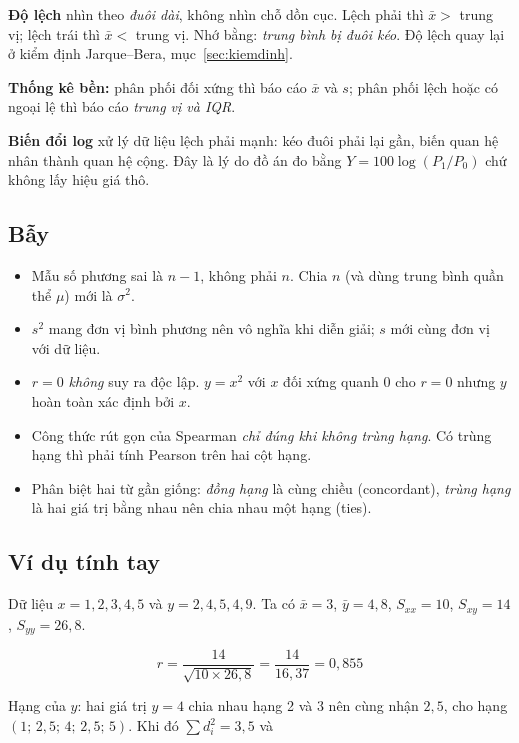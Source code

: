 \documentclass[11pt]{article}
\begin{document}
\textbf{Độ lệch} nhìn theo \emph{đuôi dài}, không nhìn chỗ dồn cục. Lệch phải thì
$\bar x >$ trung vị; lệch trái thì $\bar x <$ trung vị. Nhớ bằng: \emph{trung bình
bị đuôi kéo}. Độ lệch quay lại ở kiểm định Jarque--Bera, mục~\ref{sec:kiemdinh}.

\textbf{Thống kê bền:} phân phối đối xứng thì báo cáo $\bar x$ và $s$; phân phối
lệch hoặc có ngoại lệ thì báo cáo \emph{trung vị và IQR}.

\textbf{Biến đổi log} xử lý dữ liệu lệch phải mạnh: kéo đuôi phải lại gần, biến
quan hệ nhân thành quan hệ cộng. Đây là lý do đồ án đo bằng
$Y = 100\log(P_1/P_0)$ chứ không lấy hiệu giá thô.

\subsection*{Bẫy}

\begin{itemize}
\item Mẫu số phương sai là $n-1$, không phải $n$. Chia $n$ (và dùng trung bình
      quần thể $\mu$) mới là $\sigma^2$.
\item $s^2$ mang đơn vị bình phương nên vô nghĩa khi diễn giải; $s$ mới cùng đơn
      vị với dữ liệu.
\item $r=0$ \emph{không} suy ra độc lập. $y=x^2$ với $x$ đối xứng quanh 0 cho
      $r=0$ nhưng $y$ hoàn toàn xác định bởi $x$.
\item Công thức rút gọn của Spearman \emph{chỉ đúng khi không trùng hạng}. Có
      trùng hạng thì phải tính Pearson trên hai cột hạng.
\item Phân biệt hai từ gần giống: \emph{đồng hạng} là cùng chiều (concordant),
      \emph{trùng hạng} là hai giá trị bằng nhau nên chia nhau một hạng (ties).
\end{itemize}

\subsection*{Ví dụ tính tay}

Dữ liệu $x = 1,2,3,4,5$ và $y = 2,4,5,4,9$. Ta có $\bar x = 3$, $\bar y = 4{,}8$,
$S_{xx}=10$, $S_{xy}=14$, $S_{yy}=26{,}8$.

\[
r = \frac{14}{\sqrt{10 \times 26{,}8}} = \frac{14}{16{,}37} = 0{,}855
\]

Hạng của $y$: hai giá trị $y=4$ chia nhau hạng 2 và 3 nên cùng nhận $2{,}5$, cho
hạng $(1;\,2{,}5;\,4;\,2{,}5;\,5)$. Khi đó $\sum d_i^2 = 3{,}5$ và
\end{document}
